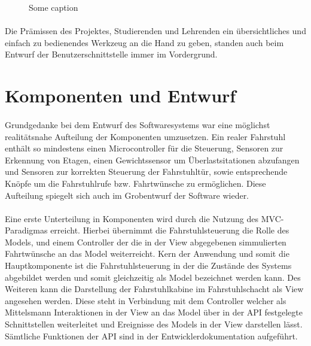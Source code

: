 \begin{figure}[h]
	\centering
	\caption{Some caption}
	\label{UI_final}
\end{figure}

\paragraph{}
Die Prämissen des Projektes, Studierenden und Lehrenden ein übersichtliches und einfach zu bedienendes Werkzeug an die Hand zu geben, standen auch beim Entwurf der Benutzerschnittstelle immer im Vordergrund.


\section{Komponenten und Entwurf}

\paragraph{}
Grundgedanke bei dem Entwurf des Softwaresystems war eine möglichst realitätsnahe Aufteilung der Komponenten umzusetzen.
Ein realer Fahrstuhl enthält so mindestens einen Microcontroller für die Steuerung, Sensoren zur Erkennung von Etagen, einen Gewichtssensor um Überlastsitationen abzufangen und Sensoren zur korrekten Steuerung der Fahrstuhltür, sowie entsprechende Knöpfe um die Fahrstuhlrufe bzw. Fahrtwünsche zu ermöglichen.
Diese Aufteilung spiegelt sich auch im Grobentwurf der Software wieder.

\paragraph{}
Eine erste Unterteilung in Komponenten wird durch die Nutzung des MVC-Paradigmas erreicht.
Hierbei übernimmt die Fahrstuhlsteuerung die Rolle des Models,  und einem Controller der die in der View abgegebenen simmulierten Fahrtwünsche an das Model weiterreicht.
Kern der Anwendung und somit die Hauptkomponente ist die Fahrstuhlsteuerung in der die Zustände des Systems abgebildet werden und somit gleichzeitig als Model bezeichnet werden kann.
Des Weiteren kann die Darstellung der Fahrstuhlkabine im Fahrstuhlschacht als View angesehen werden.
Diese steht in Verbindung mit dem Controller welcher als Mittelsmann Interaktionen in der View an das Model über in der \acrshort{API} festgelegte Schnittstellen weiterleitet und Ereignisse des Models in der View darstellen lässt.
Sämtliche Funktionen der \acrshort{API} sind in der Entwicklerdokumentation aufgeführt.


